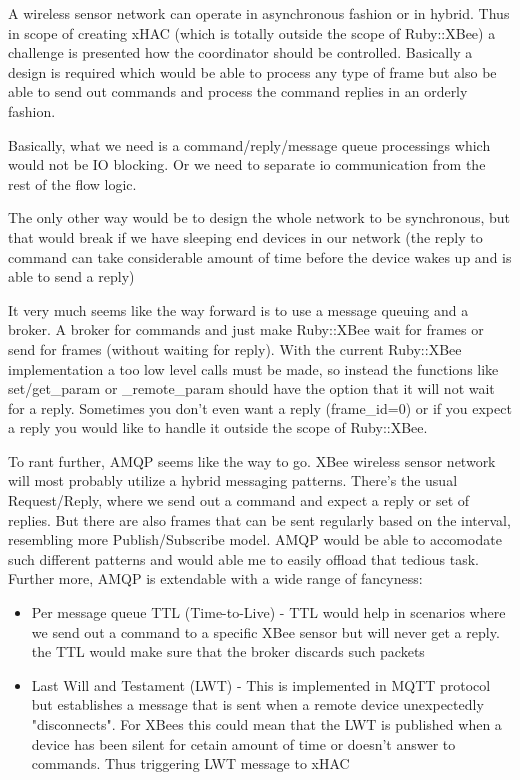 \noindent A wireless sensor network can operate in asynchronous fashion or in hybrid. Thus in scope of creating xHAC (which is totally outside the scope of Ruby::XBee) a challenge is presented how the coordinator should be controlled. Basically a design is required which would be able to process any type of frame but also be able to send out commands and process the command replies in an orderly fashion.

\noindent Basically, what we need is a command/reply/message queue processings which would not be IO blocking. Or we need to separate io communication from the rest of the flow logic.

\noindent The only other way would be to design the whole network to be synchronous, but that would break if we have sleeping end devices in our network (the reply to command can take considerable amount of time before the device wakes up and is able to send a reply)

\noindent It very much seems like the way forward is to use a message queuing and a broker. A broker for commands and just make Ruby::XBee wait for frames or send for frames (without waiting for reply). With the current Ruby::XBee implementation a too low level calls must be made, so instead the functions like set/get_param or _remote_param should have the option that it will not wait for a reply. Sometimes you don't even want a reply (frame_id=0) or if you expect a reply you would like to handle it outside the scope of Ruby::XBee.

\noindent To rant further, AMQP seems like the way to go. XBee wireless sensor network will most probably utilize a hybrid messaging patterns. There's the usual Request/Reply, where we send out a command and expect a reply or set of replies. But there are also frames that can be sent regularly based on the interval, resembling more Publish/Subscribe model. AMQP would be able to accomodate such different patterns and would able me to easily offload that tedious task. Further more, AMQP is extendable with a wide range of fancyness:
\begin{itemize}
\item Per message queue TTL (Time-to-Live) - TTL would help in scenarios where we send out a command to a specific XBee sensor but will never get a reply. the TTL would make sure that the broker discards such packets
\item Last Will and Testament (LWT) - This is implemented in MQTT protocol but establishes a message that is sent when a remote device unexpectedly "disconnects". For XBees this could mean that the LWT is published when a device has been silent for cetain amount of time or doesn't answer to commands. Thus triggering LWT message to xHAC
\end{itemize}

